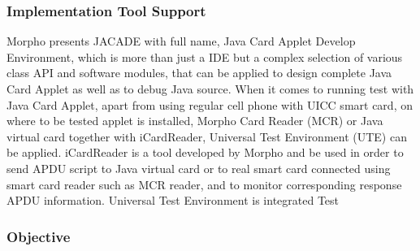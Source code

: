 \documentclass[]{llncs}
\begin{document}
\subsubsection{Implementation Tool Support}
Morpho presents JACADE with full name, Java Card Applet Develop Environment, which is more than just a IDE but a complex selection of various class API and software modules, that can be applied to design complete Java Card Applet as well as to debug Java source. When it comes to running test with Java Card Applet, apart from using regular cell phone with UICC smart card, on where to be tested applet is installed, Morpho Card Reader (MCR) or Java virtual card together with iCardReader, Universal Test Environment (UTE) can be applied. iCardReader is a tool developed by Morpho and be used in order to send APDU script to Java virtual card or to real smart card connected using smart card reader such as MCR reader, and to monitor corresponding response APDU information. Universal Test Environment is integrated Test

\subsubsection{Objective}




\end{document}
